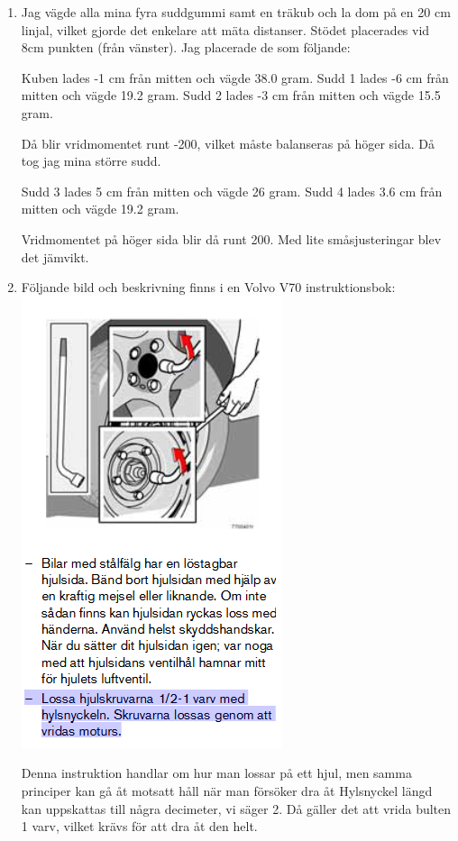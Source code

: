 \documentclass[a4paper,12pt]{article}
\begin{document}
\begin{enumerate}
      \item Jag vägde alla mina fyra suddgummi samt en träkub
            och la dom på en 20 cm linjal, vilket gjorde det enkelare
            att mäta distanser. Stödet placerades vid 8cm punkten (från vänster).
            Jag placerade de som följande:

            Kuben lades -1 cm från mitten och vägde 38.0 gram.
            Sudd 1 lades -6 cm från mitten och vägde 19.2 gram.
            Sudd 2 lades -3 cm från mitten och vägde 15.5 gram.

            Då blir vridmomentet runt -200, vilket måste balanseras på höger sida.
            Då tog jag mina större sudd.

            Sudd 3 lades 5 cm från mitten och vägde 26 gram.
            Sudd 4 lades 3.6 cm från mitten och vägde 19.2 gram.

            Vridmomentet på höger sida blir då runt 200.
            Med lite småsjusteringar blev det jämvikt.

      \item
            Följande bild och beskrivning finns i en Volvo V70 instruktionsbok:
            \includegraphics{Figur.png}

            Denna instruktion handlar om hur man lossar på ett hjul, men samma principer
            kan gå åt motsatt håll när man försöker dra åt
            Hylsnyckel längd kan uppskattas till några decimeter, vi säger 2. Då gäller det att vrida
            bulten 1 varv, vilket krävs för att dra åt den helt.


\end{enumerate}
\end{document}
